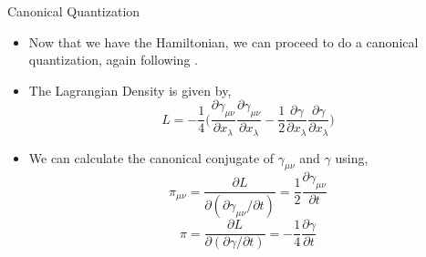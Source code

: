 \documentclass[12pt,aspectratio=1610]{beamer}
\newcommand{\munu}{\mu\nu}
\begin{document}
\begin{frame}{Canonical Quantization}
    \begin{itemize}
        \item Now that we have the Hamiltonian, we can proceed to do a canonical quantization, again following \citet{Gupta_1952}.
        \item The Lagrangian Density is given by,
        \begin{equation*}
    L = -\frac{1}{4}\Bigg(\frac{\partial\gamma_{\munu}}{\partial x_{\lambda}}\frac{\partial\gamma_{\munu}}{\partial x_{\lambda}} - \frac{1}{2}\frac{\partial\gamma}{\partial x_{\lambda}}\frac{\partial\gamma}{\partial x_{\lambda}}\Bigg)
\end{equation*}
        \item We can calculate the canonical conjugate of $\gamma_{\munu}$ and $\gamma$ using,
        \begin{equation*}
    \pi_{\munu} = \frac{\partial L}{\partial (\partial \gamma_{\munu}/\partial t)} = \frac{1}{2}\frac{\partial \gamma_{\munu}}{\partial t}
\end{equation*}
\begin{equation*}
    \pi = \frac{\partial L}{\partial (\partial \gamma/\partial t)} = -\frac{1}{4}\frac{\partial \gamma}{\partial t}
\end{equation*}
    \end{itemize}
\end{frame}
\end{document}
